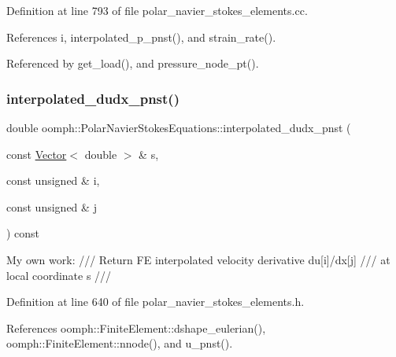 Definition at line 793 of file polar\+\_\+navier\+\_\+stokes\+\_\+elements.\+cc.



References i, interpolated\+\_\+p\+\_\+pnst(), and strain\+\_\+rate().



Referenced by get\+\_\+load(), and pressure\+\_\+node\+\_\+pt().

\mbox{\label{classoomph_1_1PolarNavierStokesEquations_af92453e32bfbc37cd9dd93992d1e4211}} 
\subsubsection{\texorpdfstring{interpolated\+\_\+dudx\+\_\+pnst()}{interpolated\_dudx\_pnst()}}
{\footnotesize\ttfamily double oomph\+::\+Polar\+Navier\+Stokes\+Equations\+::interpolated\+\_\+dudx\+\_\+pnst (\begin{DoxyParamCaption}\item[{const \hyperlink{classoomph_1_1Vector}{Vector}$<$ double $>$ \&}]{s,  }\item[{const unsigned \&}]{i,  }\item[{const unsigned \&}]{j }\end{DoxyParamCaption}) const\hspace{0.3cm}{\ttfamily [inline]}}

My own work\+: /// Return FE interpolated velocity derivative du\mbox{[}i\mbox{]}/dx\mbox{[}j\mbox{]} /// at local coordinate s /// 

Definition at line 640 of file polar\+\_\+navier\+\_\+stokes\+\_\+elements.\+h.



References oomph\+::\+Finite\+Element\+::dshape\+\_\+eulerian(), oomph\+::\+Finite\+Element\+::nnode(), and u\+\_\+pnst().

\mbox{\label{classoomph_1_1PolarNavierStokesEquations_afcc85389a45dfa0e811852012fc40442}} 
